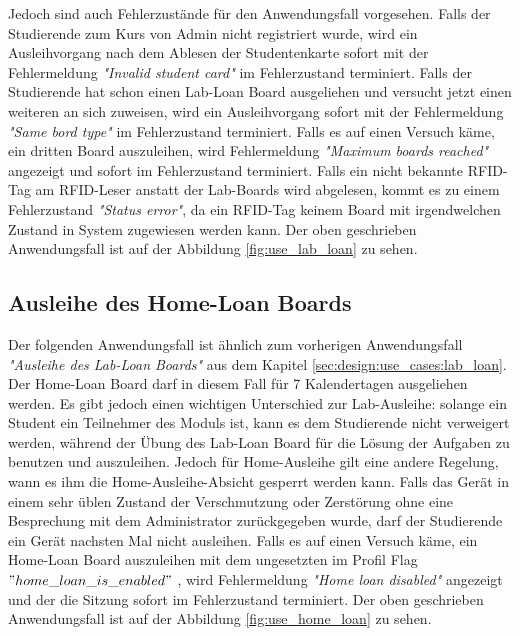 Jedoch sind auch Fehlerzustände für den Anwendungsfall vorgesehen. Falls der Studierende zum Kurs von Admin nicht registriert wurde, wird ein Ausleihvorgang nach dem Ablesen der Studentenkarte sofort mit der Fehlermeldung \textit{"Invalid student card"} im Fehlerzustand terminiert. Falls der Studierende hat schon einen Lab-Loan Board ausgeliehen und versucht jetzt einen weiteren an sich zuweisen, wird ein Ausleihvorgang sofort mit der Fehlermeldung \textit{"Same bord type"} im Fehlerzustand terminiert. Falls es auf einen Versuch käme, ein dritten Board auszuleihen, wird Fehlermeldung \textit{"Maximum boards reached"} angezeigt und sofort im Fehlerzustand terminiert. Falls ein nicht bekannte RFID-Tag am RFID-Leser anstatt der Lab-Boards wird abgelesen, kommt es zu einem Fehlerzustand \textit{"Status error"}, da ein RFID-Tag keinem Board mit irgendwelchen Zustand in System zugewiesen werden kann. Der oben geschrieben Anwendungsfall ist auf der Abbildung \ref{fig:use_lab_loan} zu sehen.


\subsection{Ausleihe des Home-Loan Boards}
\label{sec:design:use_cases:home_loan}
Der folgenden Anwendungsfall ist ähnlich zum vorherigen Anwendungsfall \textit{"Ausleihe des Lab-Loan Boards"} aus dem Kapitel \ref{sec:design:use_cases:lab_loan}. Der Home-Loan Board darf in diesem Fall für 7 Kalendertagen ausgeliehen werden. Es gibt jedoch einen wichtigen Unterschied zur Lab-Ausleihe: solange ein Student ein Teilnehmer des Moduls ist, kann es dem Studierende nicht verweigert werden, während der Übung des Lab-Loan Board für die Lösung der Aufgaben zu benutzen und auszuleihen. Jedoch für Home-Ausleihe gilt eine andere Regelung, wann es ihm die Home-Ausleihe-Absicht gesperrt werden kann. Falls das Gerät in einem sehr üblen Zustand der Verschmutzung oder Zerstörung ohne eine Besprechung mit dem Administrator zurückgegeben wurde, darf der Studierende ein Gerät nachsten Mal nicht ausleihen. Falls es auf einen Versuch käme, ein Home-Loan Board auszuleihen mit dem ungesetzten im Profil Flag $"home\_loan\_is\_enabled"$ , wird Fehlermeldung \textit{"Home loan disabled"} angezeigt und der die Sitzung sofort im Fehlerzustand terminiert.  Der oben geschrieben Anwendungsfall ist auf der Abbildung \ref{fig:use_home_loan} zu sehen.

